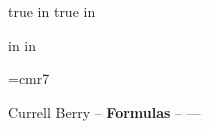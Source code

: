 
%

\sloppy


 true in
 true in
\nopagenumbers

 in
 in
\hsize=8in
\vsize=10.5in
\parindent=0pt

\font\smallfont=cmr7

\centerline{Currell Berry -- {\bf Formulas} -- \number\year --\number\month --\number\day}
\smallskip %

\splittopskip=18.3pt
\def\strutA#1#2{\vrule height#1 depth#2 width0pt}

